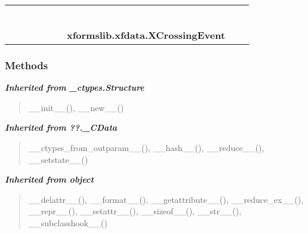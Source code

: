     \label{xformslib:xfdata:XCrossingEvent}
\begin{tabular}{cccccccccc}
\multicolumn{2}{r}{\settowidth{\BCL}{object}\multirow{2}{\BCL}{object}}
&&
&&
&&
  \\\cline{3-3}
  &&\multicolumn{1}{c|}{}
&&
&&
&&
  \\
\multicolumn{4}{r}{\settowidth{\BCL}{??.\_CData}\multirow{2}{\BCL}{??.\_CData}}
&&
&&
  \\\cline{5-5}
  &&&&\multicolumn{1}{c|}{}
&&
&&
  \\
\multicolumn{6}{r}{\settowidth{\BCL}{\_ctypes.Structure}\multirow{2}{\BCL}{\_ctypes.Structure}}
&&
  \\\cline{7-7}
  &&&&&&\multicolumn{1}{c|}{}
&&
  \\
&&&&&&\multicolumn{2}{l}{\textbf{xformslib.xfdata.XCrossingEvent}}
\end{tabular}



  \subsubsection{Methods}


\large{\textbf{\textit{Inherited from \_ctypes.Structure}}}

\begin{quote}
\_\_init\_\_(), \_\_new\_\_()
\end{quote}

\large{\textbf{\textit{Inherited from ??.\_CData}}}

\begin{quote}
\_\_ctypes\_from\_outparam\_\_(), \_\_hash\_\_(), \_\_reduce\_\_(), \_\_setstate\_\_()
\end{quote}

\large{\textbf{\textit{Inherited from object}}}

\begin{quote}
\_\_delattr\_\_(), \_\_format\_\_(), \_\_getattribute\_\_(), \_\_reduce\_ex\_\_(), \_\_repr\_\_(), \_\_setattr\_\_(), \_\_sizeof\_\_(), \_\_str\_\_(), \_\_subclasshook\_\_()
\end{quote}

